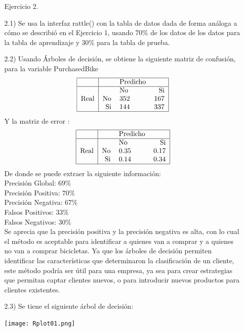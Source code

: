 \documentclass[11pt,a4paper]{report}
\begin{document}
\begin{itemize}
\item[Ejercicio 2.] 
\item[2.1)] Se usa la interfaz rattle() con la tabla de datos dada de forma análoga a cómo se describió en el Ejercicio 1, usando 70\% de los datos de los datos para la tabla de aprendizaje y 30\% para la tabla de prueba.
\item[2.2)]Usando Árboles de decisión, se obtiene la siguiente matriz de confusión, para la variable PurchasedBike
$$\begin{tabular}{| c |  r l  r |}
\hline
  & & Predicho&  \\
   \hline
     &  & No& Si \\
 Real& No   &352 &167 \\
     & Si   & 144& 337\\
   \hline
 \end{tabular} $$
Y la matriz de error :
$$\begin{tabular}{| c |  r l  r |}
\hline
  & & Predicho&  \\
   \hline
     &  & No& Si \\
 Real& No   &0.35 &0.17 \\
     & Si   & 0.14& 0.34\\
   \hline
 \end{tabular} $$
De donde se puede extraer la siguiente información:\\
Precisión Global: $69\%$\\
Precisión Positiva: $70\%$\\
Precisión Negativa: $67\%$\\
Falsos Positivos: $33\%$ \\
Falsos Negativos: $30\%$\\
Se aprecia que la precisión positiva y la precisión negativa es alta, con lo cual el método es aceptable para identificar a quienes van a comprar y a quienes no van a comprar bicicletas. Ya que los árboles de decisión permiten identificar las características que determinaron la clasificación de un cliente, este método podría ser útil para una empresa, ya sea para crear estrategias que permitan captar clientes nuevos, o para introducir nuevos productos para clientes existentes.

\item[2.3)] Se tiene el siguiente árbol de decisión:
\begin{center}
\texttt{[image: Rplot01.png]}
\end{center}


\end{itemize}
\end{document}
